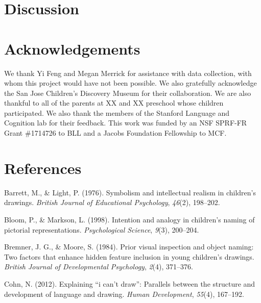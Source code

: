 \documentclass[
  english,
  man]{apa6}
\begin{document}
\hypertarget{discussion}{%
\section{Discussion}\label{discussion}}

\hypertarget{acknowledgements}{%
\section{Acknowledgements}\label{acknowledgements}}

We thank Yi Feng and Megan Merrick for assistance with data collection, with whom this project would have not been possible. We also gratefully acknowledge the San Jose Children's Discovery Museum for their collaboration. We are also thankful to all of the parents at XX and XX preschool whose children participated. We also thank the members of the Stanford Language and Cognition lab for their feedback. This work was funded by an NSF SPRF-FR Grant \#1714726 to BLL and a Jacobs Foundation Fellowship to MCF.

\newpage

\hypertarget{references}{%
\section{References}\label{references}}

\begingroup
\setlength{\parindent}{-0.5in}
\setlength{\leftskip}{0.5in}

\hypertarget{refs}{}
\leavevmode\hypertarget{ref-barrett1976symbolism}{}%
Barrett, M., \& Light, P. (1976). Symbolism and intellectual realism in children's drawings. \emph{British Journal of Educational Psychology}, \emph{46}(2), 198--202.

\leavevmode\hypertarget{ref-bloom1998intention}{}%
Bloom, P., \& Markson, L. (1998). Intention and analogy in children's naming of pictorial representations. \emph{Psychological Science}, \emph{9}(3), 200--204.

\leavevmode\hypertarget{ref-bremmer1984prior}{}%
Bremner, J. G., \& Moore, S. (1984). Prior visual inspection and object naming: Two factors that enhance hidden feature inclusion in young children's drawings. \emph{British Journal of Developmental Psychology}, \emph{2}(4), 371--376.

\leavevmode\hypertarget{ref-cohn2012explaining}{}%
Cohn, N. (2012). Explaining ``i can't draw'': Parallels between the structure and development of language and drawing. \emph{Human Development}, \emph{55}(4), 167--192.
\end{document}
